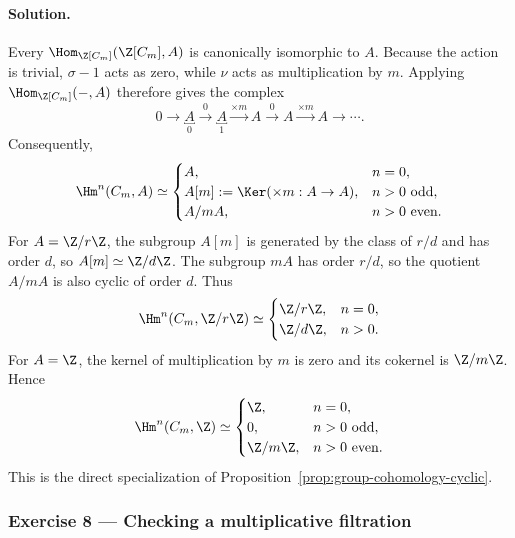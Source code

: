 \paragraph{Solution.}
\hypertarget{o014.mastery.derived-spectral.002.sol07}{ }
Every $\Hom_{\Z[C_m]}(\Z[C_m],A)$ is canonically isomorphic to $A$.
Because the action is trivial, $\sigma-1$ acts as zero, while $\nu$ acts as
multiplication by $m$. Applying $\Hom_{\Z[C_m]}(-,A)$ therefore gives the
complex
\[
	0\to\underbracket{A}_{0}\xrightarrow{0}
	\underbracket{A}_{1}\xrightarrow{\times m}A
	\xrightarrow{0}A\xrightarrow{\times m}A\to\cdots.
\]
Consequently,
\[
	\Hm^n(C_m,A)\simeq
	\begin{cases}
		A,&n=0,\\
		A[m]:=\Ker(\times m:A\to A),&n>0\text{ odd},\\
		A/mA,&n>0\text{ even}.
	\end{cases}
\]
For $A=\Z/r\Z$, the subgroup $A[m]$ is generated by the class of $r/d$
and has order $d$, so $A[m]\simeq\Z/d\Z$. The subgroup $mA$ has order
$r/d$, so the quotient $A/mA$ is also cyclic of order $d$. Thus
\[
	\Hm^n(C_m,\Z/r\Z)\simeq
	\begin{cases}
		\Z/r\Z,&n=0,\\
		\Z/d\Z,&n>0.
	\end{cases}
\]
For $A=\Z$, the kernel of multiplication by $m$ is zero and its cokernel is
$\Z/m\Z$. Hence
\[
	\Hm^n(C_m,\Z)\simeq
	\begin{cases}
		\Z,&n=0,\\
		0,&n>0\text{ odd},\\
		\Z/m\Z,&n>0\text{ even}.
	\end{cases}
\]
This is the direct specialization of
Proposition~\ref{prop:group-cohomology-cyclic}.

\subsubsection*{Exercise 8 --- Checking a multiplicative filtration}
\hypertarget{o014.mastery.derived-spectral.002.ex08}{ }
\label{mastery:derived-spectral-002-ex08}


